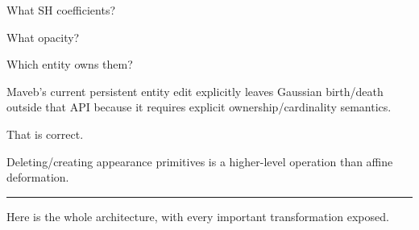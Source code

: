 What SH coefficients?

What opacity?

Which entity owns them?

Maveb's current persistent entity edit explicitly leaves Gaussian birth/death outside that API because it requires explicit ownership/cardinality semantics.

That is correct.

Deleting/creating appearance primitives is a higher-level operation than affine deformation.

\begin{center}\rule{0.5\linewidth}{0.5pt}\end{center}

Here is the whole architecture, with every important transformation exposed.

